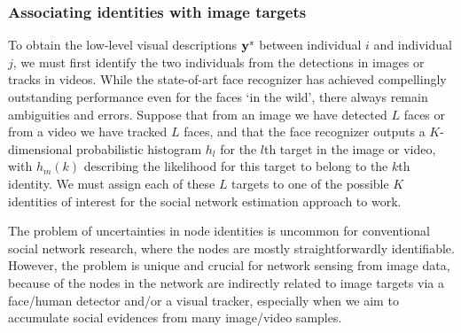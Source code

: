 
\subsubsection{Associating identities with image targets}
\label{sec:assoc}

To obtain the low-level visual descriptions ${\bf y}^s$ between individual $i$ and individual $j$, we must first identify the two individuals from the detections in images or tracks in videos. While the state-of-art face recognizer has achieved compellingly outstanding performance even for the faces `in the wild', there always remain ambiguities and errors. Suppose that from an image we have detected $L$ faces or from a video we have tracked $L$ faces, and that the face recognizer outputs a $K$-dimensional probabilistic histogram $h_l$ for the $l$th target in the image or video, with $h_m(k)$ describing the likelihood for this target to belong to the $k$th identity. We must assign each of these $L$ targets to one of the possible $K$ identities of interest for the social network estimation approach to work. 

The problem of uncertainties in node identities is uncommon for conventional social network research, where the nodes are mostly straightforwardly identifiable. However, the problem is unique and crucial for network sensing from image data, because of the nodes in the network are indirectly related to image targets via a face/human detector and/or a visual tracker, especially when we aim to accumulate social evidences from many image/video samples.

